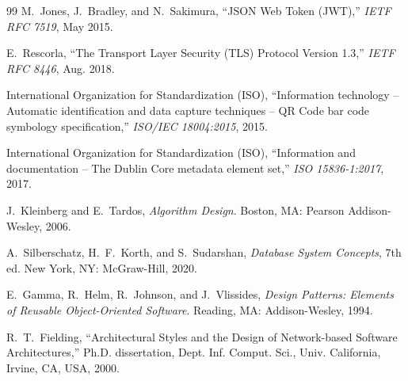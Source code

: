 \begin{thebibliography}{99}
M.~Jones, J.~Bradley, and N.~Sakimura, ``JSON Web Token (JWT),'' \textit{IETF RFC 7519}, May 2015.

E.~Rescorla, ``The Transport Layer Security (TLS) Protocol Version 1.3,'' \textit{IETF RFC 8446}, Aug. 2018.

International Organization for Standardization (ISO), ``Information technology -- Automatic identification and data capture techniques -- QR Code bar code symbology specification,'' \textit{ISO/IEC 18004:2015}, 2015.

International Organization for Standardization (ISO), ``Information and documentation -- The Dublin Core metadata element set,'' \textit{ISO 15836-1:2017}, 2017.

J.~Kleinberg and E.~Tardos, \textit{Algorithm Design}. Boston, MA: Pearson Addison-Wesley, 2006.

A.~Silberschatz, H.~F.~Korth, and S.~Sudarshan, \textit{Database System Concepts}, 7th ed. New York, NY: McGraw-Hill, 2020.

E.~Gamma, R.~Helm, R.~Johnson, and J.~Vlissides, \textit{Design Patterns: Elements of Reusable Object-Oriented Software}. Reading, MA: Addison-Wesley, 1994.

R.~T.~Fielding, ``Architectural Styles and the Design of Network-based Software Architectures,'' Ph.D. dissertation, Dept. Inf. Comput. Sci., Univ. California, Irvine, CA, USA, 2000.

\end{thebibliography}
